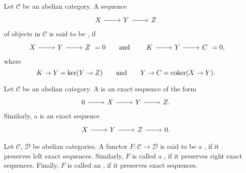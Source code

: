 \begin{definition}[Exactness]
	Let $\mathcal{C}$ be an abelian category. A sequence
	\begin{equation*}
		\begin{tikzcd}
			X \arrow[r] & Y \arrow[r] & Z
		\end{tikzcd}
	\end{equation*}
	\noindent of objects in $\mathcal{C}$ is said to be , if 
	\begin{equation*}
		\begin{tikzcd}
			X \arrow[r] & Y \arrow[r] & Z 
		\end{tikzcd} = 0 \qquad \text{and} \qquad
		\begin{tikzcd}
			K \arrow[r] & Y \arrow[r] & C
		\end{tikzcd} = 0,
	\end{equation*}
	\noindent where
	\begin{equation*}
		K \to Y = \ker(Y \to Z)
		\qquad \text{and} \qquad
		Y \to C = \operatorname{coker}(X \to Y).
	\end{equation*}
\end{definition}

\begin{definition}
	Let $\mathcal{C}$ be an abelian category. A  is an exact sequence of the form
	\begin{equation*}
		\begin{tikzcd}
			0 \arrow[r] & X \arrow[r] & Y \arrow[r] & Z.
		\end{tikzcd}
	\end{equation*}
	Similarly, a  is an exact sequence
	\begin{equation*}
		\begin{tikzcd}
			X \arrow[r] & Y \arrow[r] & Z \arrow[r] & 0.
		\end{tikzcd}
	\end{equation*}
\end{definition}

\begin{definition}
	Let $\mathcal{C}$, $\mathcal{D}$ be abelian categories. A functor $F : \mathcal{C} \to \mathcal{D}$ is said to be a , if it preserves left exact sequences. Similarly, $F$ is called a , if it preserves right exact sequences. Finally, $F$ is called an , if it preserves exact sequences.
\end{definition}


